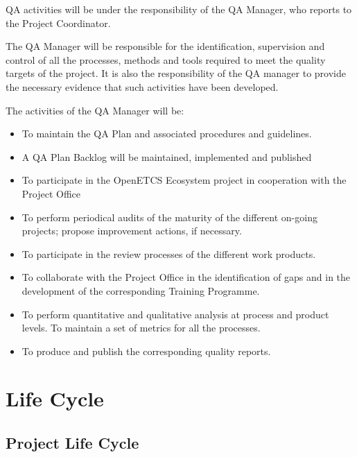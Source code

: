 \documentclass{template/openetcs_article}
\begin{document}
QA activities will be under the responsibility of the QA Manager, who reports to the Project Coordinator.

The QA Manager will be responsible for the identification, supervision and control of all the processes, methods and tools required to meet the quality targets of the project. It is also the responsibility of the QA manager to provide the necessary evidence that such activities have been developed.

The activities of the QA Manager will be:
\begin{itemize}
\item To maintain the QA Plan and associated procedures and guidelines. 
\item A QA Plan Backlog will be maintained, implemented and published
\item To participate in the OpenETCS Ecosystem project in cooperation with the Project Office
\item To perform periodical audits of the maturity of the different on-going projects; propose improvement actions, if necessary.
\item To participate in the review processes of the different work products.
\item To collaborate with the Project Office in the identification of gaps and in the development of the corresponding Training Programme.
\item To perform quantitative and qualitative analysis at process and product levels. To maintain a set of metrics for all the processes.
\item To produce and publish the corresponding quality reports.
\end{itemize}

\section{Life Cycle}



\subsection{Project Life Cycle }

\end{document}
